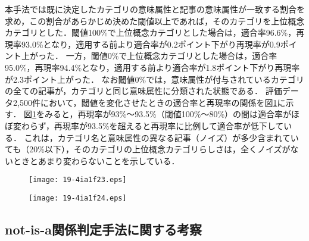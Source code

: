 \documentclass[japanese]{jnlp_1.4}
\begin{document}
本手法では既に決定したカテゴリの意味属性と記事の意味属性が一致する割合を求め，この割合があらかじめ決めた閾値以上であれば，そのカテゴリを上位概念カテゴリとした．閾値100\%で上位概念カテゴリとした場合は，適合率96.6\%，再現率93.0\%となり，適用する前より適合率が0.2ポイント下がり再現率が0.9ポイント上がった．
一方，閾値0\%で上位概念カテゴリとした場合は，適合率95.0\%，再現率94.4\%となり，適用する前より適合率が1.8ポイント下がり再現率が2.3ポイント上がった．
なお閾値0\%では，意味属性が付与されているカテゴリの全ての記事が，カテゴリと同じ意味属性に分類された状態である．
評価データ2,500件において，閾値を変化させたときの適合率と再現率の関係を図\ref{fig:kizi_bunrui_pr}に示す．
図\ref{fig:kizi_bunrui_pr}をみると，再現率が93\%〜93.5\%（閾値100\%〜80\%）の間は適合率がほぼ変わらず，再現率が93.5\%を超えると再現率に比例して適合率が低下している．
これは，カテゴリ名と意味属性の異なる記事（ノイズ）が多少含まれていても（20\%以下），そのカテゴリの上位概念カテゴリらしさは，全くノイズがないときとあまり変わらないことを示している．

\begin{figure}[t]
\setlength{\captionwidth}{191pt}
\begin{minipage}[t]{191pt}
\begin{center}
\texttt{[image: 19-4ia1f23.eps]}
\end{center}
\label{fig:joigainen_cate}
\end{minipage}
\hfill
\begin{minipage}[t]{191pt}
\begin{center}
\texttt{[image: 19-4ia1f24.eps]}
\end{center}
\label{fig:kizi_bunrui_pr}
\vspace{0.5zw}{\footnotesize
\noindent\hangafter=1\hangindent=1zw
※上位概念カテゴリを適用する前に分類した記事も精度に含む．\par
\noindent\hangafter=1\hangindent=1zw
※学習データでなく評価データ2,500件による精度である．\par
}
\end{minipage}
\vspace{-0.5zw}
\end{figure}


\subsection{not-is-a関係判定手法に関する考察}
\label{sec:isa_kousatsu}
\end{document}
